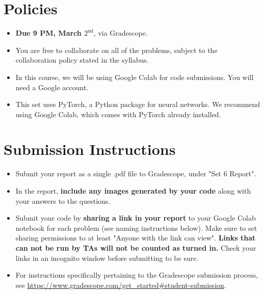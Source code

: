 \newif\ifshowsolutions
\showsolutionstrue







\pagestyle{fancy}

\section*{Policies}
\begin{itemize}
  \item \textbf{Due 9 PM, March $2^\text{nd}$}, via Gradescope.
  \item You are free to collaborate on all of the problems, subject to the collaboration policy stated in the syllabus.
  \item In this course, we will be using Google Colab for code submissions. You will need a Google account.
  \item This set uses PyTorch, a Python package for neural networks. We recommend using Google Colab, which comes with PyTorch already installed.
\end{itemize}

\section*{Submission Instructions}
\begin{itemize}
\item Submit your report as a single .pdf file to Gradescope, under "Set 6 Report". 
	\item In the report, \textbf{include any images generated by your code} along with your answers to the questions.
	\item Submit your code by \textbf{sharing a link in your report} to your Google Colab notebook for each problem (see naming instructions below). Make sure to set sharing permissions to at least "Anyone with the link can view". \textbf{Links that can not be run by TAs will not be counted as turned in.} Check your links in an incognito window before submitting to be sure. 
	\item For instructions specifically pertaining to the Gradescope submission process, see \url{https://www.gradescope.com/get_started#student-submission}.
\end{itemize}

